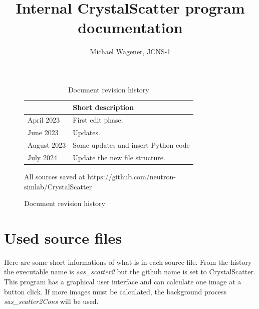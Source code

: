 \documentclass[11pt]{article} %
\author{Michael Wagener, JCNS-1}
\title{Internal CrystalScatter program documentation}
\begin{document}
\maketitle
\tableofcontents %

\begin{figure}[b] %
\begin{longtable}{|p{3cm}|p{12cm}|}
\caption{Document revision history} \\
\hline\rowcolor{rowcolor}{\bf Date} & {\bf Short description} \\
\endfirsthead
\hline
April 2023 & First edit phase. \\ \hline
June 2023 & Updates. \\ \hline
August 2023 & Some updates and insert Python code \\ \hline
July 2024 & Update the new file structure. \\ \hline
\end{longtable}

\centerline{All sources saved at https://github.com/neutron-simlab/CrystalScatter}
\end{figure}

\clearpage %


\section{Used source files}

Here are some short informations of what is in each source file. From the history the executable name is {\it sas\_scatter2} but the github name is set to CrystalScatter. This program has a graphical user interface and can calculate one image at a button click. If more images must be calculated, the background process {\it sas\_scatter2Cons} will be used.
\end{document}
